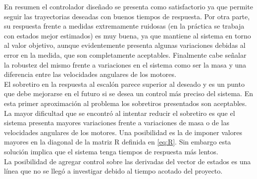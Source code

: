 \documentclass[main]{subfiles}
\begin{document}
En resumen el controlador diseñado se presenta como satisfactorio ya que permite seguir las trayectorias deseadas con buenos tiempos de respuesta. Por otra parte, su respuesta frente a medidas extremamente ruidosas (en la pr\'actica se trabaja con estados mejor estimados) es muy buena, ya que mantiene al sistema en torno al valor objetivo, aunque evidentemente presenta algunas variaciones debidas al error en la medida, que son completamente aceptables. Finalmente cabe señalar la robustez del mismo frente a variaciones en el sistema como ser la masa y una diferencia entre las velocidades angulares de los motores.\\

El sobretiro en la respuesta al escal\'on parece superior al deseado y es un punto que debe mejorarse en el futuro si se desea un control m\'as preciso del sistema. En esta primer aproximaci\'on al problema los sobretiros presentados son aceptables. La mayor dificultad que se encontr\'o al intentar reducir el sobretiro es que el sistema presenta mayores variaciones frente a variaciones de masa o de las velocidades angulares de los motores. Una posibilidad es la de imponer valores mayores en la diagonal de la matriz R definida en \ref{eq:R}. Sin embargo esta soluci\'on implica que el sistema tenga tiempos de respuesta m\'as lentos.\\

La posibilidad de agregar control sobre las derivadas del vector de estados es una l\'inea que no se lleg\'o a investigar debido al tiempo acotado del proyecto.
\end{document}
